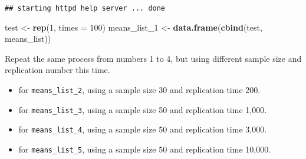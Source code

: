 \documentclass[
]{article}
\newenvironment{Shaded}{\begin{snugshade}}{\end{snugshade}}
\newcommand{\AttributeTok}[1]{\textcolor[rgb]{0.13,0.29,0.53}{#1}}
\newcommand{\ConstantTok}[1]{\textcolor[rgb]{0.56,0.35,0.01}{#1}}
\newcommand{\DecValTok}[1]{\textcolor[rgb]{0.00,0.00,0.81}{#1}}
\newcommand{\FunctionTok}[1]{\textcolor[rgb]{0.13,0.29,0.53}{\textbf{#1}}}
\newcommand{\NormalTok}[1]{#1}
\newcommand{\OtherTok}[1]{\textcolor[rgb]{0.56,0.35,0.01}{#1}}
\newcommand{\SpecialCharTok}[1]{\textcolor[rgb]{0.81,0.36,0.00}{\textbf{#1}}}
\providecommand{\tightlist}{%
  \setlength{\itemsep}{0pt}\setlength{\parskip}{0pt}}
\begin{document}
\begin{Shaded}
\end{Shaded}

\begin{verbatim}
## starting httpd help server ... done
\end{verbatim}

\begin{Shaded}
\begin{Highlighting}[]
\NormalTok{test }\OtherTok{\textless{}{-}} \FunctionTok{rep}\NormalTok{(}\DecValTok{1}\NormalTok{, }\AttributeTok{times =} \DecValTok{100}\NormalTok{)}
\NormalTok{means\_list\_1 }\OtherTok{\textless{}{-}} \FunctionTok{data.frame}\NormalTok{(}\FunctionTok{cbind}\NormalTok{(test, means\_list))}
\end{Highlighting}
\end{Shaded}

Repeat the same process from numbers 1 to 4, but using different sample
size and replication number this time.

\begin{itemize}
\tightlist
\item
  for \texttt{means\_list\_2}, using a sample size 30 and replication
  time 200.
\item
  for \texttt{means\_list\_3}, using a sample size 50 and replication
  time 1,000.\\
\item
  for \texttt{means\_list\_4}, using a sample size 50 and replication
  time 3,000.\\
\item
  for \texttt{means\_list\_5}, using a sample size 50 and replication
  time 10,000.
\end{itemize}
\end{document}
